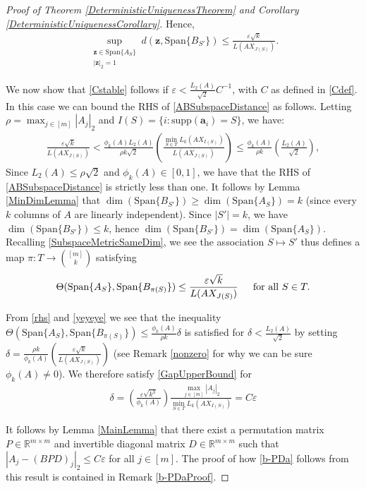\documentclass[journal, onecolumn]{IEEEtran}
\begin{document}
\begin{proof}[Proof of Theorem \ref{DeterministicUniquenessTheorem} and Corollary \ref{DeterministicUniquenessCorollary}]
Hence,
\begin{align}\label{ABSubspaceDistance}
\sup_{ \substack{ \mathbf{z} \in \text{Span}\{A_{S}\} \\ |\mathbf{z}|_2 = 1} } d(\mathbf{z}, \text{Span}\{B_{S'}\}) \leq \frac{\varepsilon\sqrt{k}}{L(AX_{J(S)})}.
\end{align}

We now show that \eqref{Cstable} follows if $\varepsilon < \frac{L_2(A)}{\sqrt{2}}C^{-1}$, with $C$ as defined in \eqref{Cdef}. In this case we can bound the RHS of \eqref {ABSubspaceDistance} as follows. Letting $\rho = \max_{j \in [m]} |A_j|_2$ and $I(S) = \{i: \text{supp}(\mathbf{a}_i)=S\}$, we have:
\begin{align}\label{rhs}
\frac{\varepsilon\sqrt{k}}{L(AX_{J(S)})} 
<  \frac{\phi_k(A) L_2(A)}{\rho k \sqrt{2}} \left( \frac{\min_{S \in T}L_k(AX_{I(S)})}{L(AX_{J(S)})} \right)
\leq \frac{\phi_k(A)}{\rho k} \left( \frac{L_2(A)}{\sqrt{2}} \right),
\end{align}
%
Since $L_2(A) \leq \rho \sqrt{2}$ and $\phi_k(A) \in [0,1]$, we have that the RHS of \eqref{ABSubspaceDistance} is strictly less than one. It follows by Lemma \ref{MinDimLemma} that $\dim(\text{Span}\{B_{S'}\}) \geq \dim(\text{Span}\{A_{S}\}) = k$ (since every $k$ columns of $A$ are linearly independent). Since $|S'| = k$, we have $\dim(\text{Span}\{B_{S'}\}) \leq k$, hence $\dim(\text{Span}\{B_{S'}\}) = \dim(\text{Span}\{A_{S}\})$. Recalling \eqref{SubspaceMetricSameDim},  we see the association $S \mapsto S'$ thus defines a map $\pi: T \to {[m] \choose k}$ satisfying
\begin{align}\label{yeyeye}
\Theta(\text{Span}\{A_{S}\}, \text{Span}\{B_{\pi(S)}\}) \leq \frac{\varepsilon\sqrt{k}}{L(AX_{J(S)})} \indent \text{for all } S \in T.
\end{align}

From \eqref{rhs} and \eqref{yeyeye} we see that the inequality $\Theta(\text{Span}\{A_{S}\}, \text{Span}\{B_{\pi(S)}\}) \leq \frac{ \phi_k(A) }{\rho k} \delta$ is satisfied for $\delta < \frac{L_2(A)}{\sqrt{2}}$ by setting $\delta = \frac{ \rho k}{ \phi_k(A) } \left(  \frac{\varepsilon \sqrt{k}}{L(AX_{J(S)})} \right)$ (see Remark \ref{nonzero} for why we can be sure $\phi_k(A) \neq 0$). We therefore satisfy \eqref{GapUpperBound} for 
\begin{align}
\delta = \left( \frac{ \varepsilon \sqrt{k^3}}{ \phi_k(A) } \right) \frac{\max_{j \in [m]} |A_j|_2}{\min_{S \in T} L_k(AX_{I(S)})}
= C\varepsilon
\end{align}

It follows by Lemma \ref{MainLemma} that there exist a permutation matrix $P \in \mathbb{R}^{m \times m}$ and invertible diagonal matrix $D \in \mathbb{R}^{m \times m}$ such that $|A_j - (BPD)_j|_2 \leq C\varepsilon$ for all $j \in [m]$. The proof of how \eqref{b-PDa} follows from this result is contained in Remark \ref{b-PDaProof}.
\end{proof}
\end{document}

